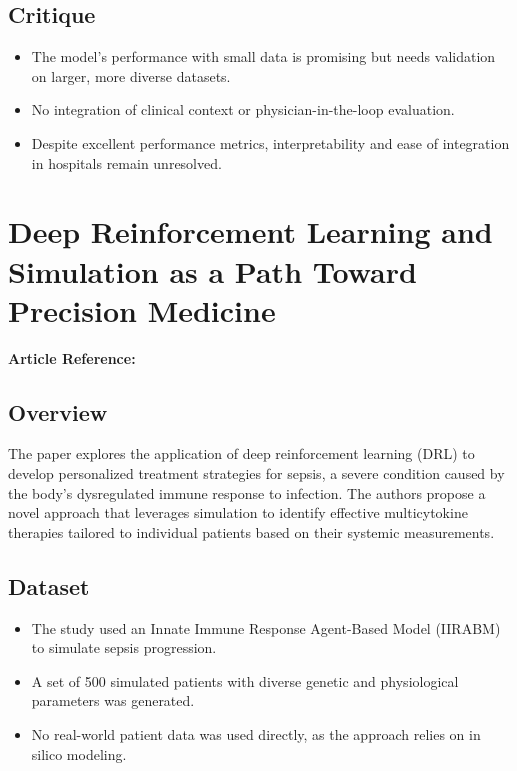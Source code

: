 \subsection*{Critique}
\begin{itemize}
    \item The model's performance with small data is promising but needs validation on larger, more diverse datasets.
    \item No integration of clinical context or physician-in-the-loop evaluation.
    \item Despite excellent performance metrics, interpretability and ease of integration in hospitals remain unresolved.
\end{itemize}

\section{Deep Reinforcement Learning and Simulation as a Path Toward Precision Medicine}
\textbf{Article Reference:} \cite{petersenDeepReinforcementLearning2019}

\subsection*{Overview}
The paper explores the application of deep reinforcement learning (DRL) to develop personalized treatment strategies for sepsis, a severe condition caused by the body's dysregulated immune response to infection. The authors propose a novel approach that leverages simulation to identify effective multicytokine therapies tailored to individual patients based on their systemic measurements.

\subsection*{Dataset}
\begin{itemize}
    \item The study used an Innate Immune Response Agent-Based Model (IIRABM) to simulate sepsis progression.
    \item A set of 500 simulated patients with diverse genetic and physiological parameters was generated.
    \item No real-world patient data was used directly, as the approach relies on in silico modeling.
\end{itemize}

